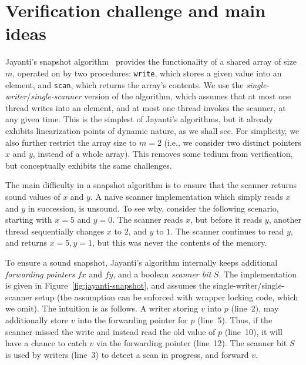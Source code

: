 \section{Verification challenge and main ideas}
\label{sc:overview}




\newcommand{\fx}{fx}
\newcommand{\fy}{fy}
\newcommand{\x}{x}
\newcommand{\y}{y}
\newcommand{\s}{S}

Jayanti's snapshot algorithm~\cite{Jayanti:STOC05} provides the
functionality of a shared array of size $m$, operated on by two
procedures: {\tt write}, which stores a given value into an element,
and {\tt scan}, which returns the array's contents. We use the
\emph{single-writer}/\emph{single-scanner} version of the algorithm,
which assumes that at most one thread writes into an element, and at
most one thread invokes the scanner, at any given time.
% 
This is the simplest of Jayanti's algorithms, but it already exhibits
linearization points of dynamic nature, as we shall see. For
simplicity, we also further restrict the array size to $m=2$ (i.e., we
consider two distinct pointers $\x$ and $\y$, instead of a whole
array). This removes some tedium from verification, but conceptually
exhibits the same challenges.
 
The main difficulty in a snapshot algorithm is to ensure that the
scanner returns sound values of $\x$ and $\y$. A naive scanner
implementation which simply reads $\x$ and $\y$ in succession, is
unsound. To see why, consider the following scenario, starting with
$\x=5$ and $\y=0$. The scanner reads $\x$, but before it reads $\y$,
another thread sequentially changes $\x$ to $2$, and $\y$ to $1$. The
scanner continues to read $\y$, and returns $\x=5, \y=1$, but this was
never the contents of the memory.

To ensure a sound snapshot, Jayanti's algorithm internally keeps
additional \emph{forwarding pointers} $\fx$ and $\fy$, and a boolean
\emph{scanner bit} $\s$. The implementation is given in
Figure~\ref{fig:jayanti-snapshot}, and assumes the
single-writer/single-scanner setup (the assumption can be enforced
with wrapper locking code, which we omit).
%
The intuition is as follows. A writer storing $v$ into $p$ (line~2),
may additionally store $v$ into the forwarding pointer for $p$
(line~5). Thus, if the scanner missed the write and instead read the
old value of $p$ (line~10), it will have a chance to catch $v$ via the
forwarding pointer (line~12). The scanner bit $S$ is used by writers
(line~3) to detect a scan in progress, and forward $v$.

